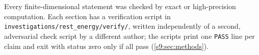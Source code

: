 Every finite-dimensional statement was checked by exact or high-precision computation. Each section has a verification script in
\texttt{investigations/rest\_energy/verify/}, written independently of a second, adversarial check script by a different author; the
scripts print one \texttt{PASS} line per claim and exit with status zero only if all pass (\cref{s9:sec:methods}).
